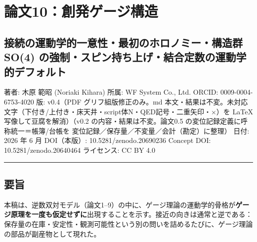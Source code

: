 \documentclass[
]{ltjsarticle}
\author{}
\date{}
\begin{document}
\section{論文10：創発ゲージ構造}\label{ux8ad6ux658710ux5275ux767aux30b2ux30fcux30b8ux69cbux9020}

\subsection{接続の運動学的一意性・最初のホロノミー・構造群 SO(4)
の強制・スピン持ち上げ・結合定数の運動学的デフォルト}\label{ux63a5ux7d9aux306eux904bux52d5ux5b66ux7684ux4e00ux610fux6027ux6700ux521dux306eux30dbux30edux30ceux30dfux30fcux69cbux9020ux7fa4-so4-ux306eux5f37ux5236ux30b9ux30d4ux30f3ux6301ux3061ux4e0aux3052ux7d50ux5408ux5b9aux6570ux306eux904bux52d5ux5b66ux7684ux30c7ux30d5ux30a9ux30ebux30c8}

著者: 木原 範昭 (Noriaki Kihara) 所属: WF System Co., Ltd. ORCID:
0009-0004-6753-4020 版: v0.4（PDF グリフ組版修正のみ。md
本文・結果は不変。未対応文字（下付き/上付き・床天井・script体N・QED記号・二重矢印・×）を
LaTeX 写像して豆腐を解消）（v0.2 の内容・結果は不変。論文0.5
の変位記録定義に呼称統一＝帳簿/台帳を
変位記録／保存量／不変量／会計（勘定）に整理） 日付: 2026 年 6 月
DOI（本版）: 10.5281/zenodo.20690236 Concept DOI:
10.5281/zenodo.20640464 ライセンス: CC BY 4.0

\begin{center}\rule{0.5\linewidth}{0.5pt}\end{center}

\subsection{要旨}\label{ux8981ux65e8}

本稿は、逆数双対モデル（論文1--9）の中に、ゲージ理論の運動学的骨格が\textbf{ゲージ原理を一度も仮定せずに}出現することを示す。接近の向きは通常と逆である：保存量の在庫・安定性・観測可能性という別の問いを詰めるたびに、ゲージ理論の部品が副産物として現れた。
\end{document}
